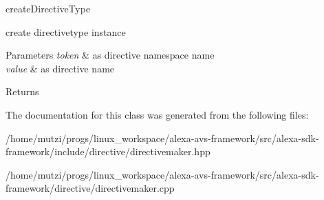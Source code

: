 create\+Directive\+Type 

create directivetype instance 
\begin{DoxyParams}{Parameters}
{\em token} & as directive namespace name \\
\hline
{\em value} & as directive name \\
\hline
\end{DoxyParams}
\begin{DoxyReturn}{Returns}

\end{DoxyReturn}


The documentation for this class was generated from the following files\+:\begin{DoxyCompactItemize}
\item 
/home/mutzi/progs/linux\+\_\+workspace/alexa-\/avs-\/framework/src/alexa-\/sdk-\/framework/include/directive/directivemaker.\+hpp\item 
/home/mutzi/progs/linux\+\_\+workspace/alexa-\/avs-\/framework/src/alexa-\/sdk-\/framework/directive/directivemaker.\+cpp\end{DoxyCompactItemize}
